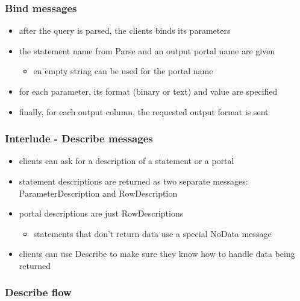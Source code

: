\documentclass{beamer}
\begin{document}
\begin{frame}
  \frametitle{Bind messages}

  \begin{itemize}
  \item after the query is parsed, the clients binds its parameters
  \item the statement name from Parse and an output portal name are given
    \begin{itemize}
    \item en empty string can be used for the portal name
    \end{itemize}
  \item for each parameter, its format (binary or text) and value are specified
  \item finally, for each output column, the requested output format is sent
  \end{itemize}

\end{frame}

\begin{frame}
  \frametitle{Interlude - Describe messages}

  \begin{itemize}
  \item clients can ask for a description of a statement or a portal
  \item statement descriptions are returned as two separate messages:
    ParameterDescription and RowDescription
  \item portal descriptions are just RowDescriptions
    \begin{itemize}
    \item statements that don't return data use a special NoData message
    \end{itemize}
  \item clients can use Describe to make sure they know how to handle data
    being returned
  \end{itemize}
\end{frame}


\begin{frame}
  \frametitle{Describe flow}

\end{frame}
\end{document}

